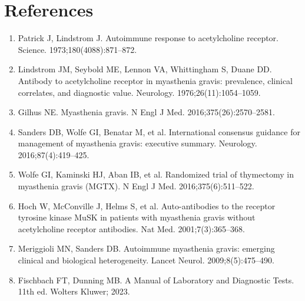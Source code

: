 \section*{References}
\begin{enumerate}
  \item Patrick J, Lindstrom J. Autoimmune response to acetylcholine receptor. Science. 1973;180(4088):871--872.
  \item Lindstrom JM, Seybold ME, Lennon VA, Whittingham S, Duane DD. Antibody to acetylcholine receptor in myasthenia gravis: prevalence, clinical correlates, and diagnostic value. Neurology. 1976;26(11):1054--1059.
  \item Gilhus NE. Myasthenia gravis. N Engl J Med. 2016;375(26):2570--2581.
  \item Sanders DB, Wolfe GI, Benatar M, et al. International consensus guidance for management of myasthenia gravis: executive summary. Neurology. 2016;87(4):419--425.
  \item Wolfe GI, Kaminski HJ, Aban IB, et al. Randomized trial of thymectomy in myasthenia gravis (MGTX). N Engl J Med. 2016;375(6):511--522.
  \item Hoch W, McConville J, Helms S, et al. Auto-antibodies to the receptor tyrosine kinase MuSK in patients with myasthenia gravis without acetylcholine receptor antibodies. Nat Med. 2001;7(3):365--368.
  \item Meriggioli MN, Sanders DB. Autoimmune myasthenia gravis: emerging clinical and biological heterogeneity. Lancet Neurol. 2009;8(5):475--490.
  \item Fischbach FT, Dunning MB. A Manual of Laboratory and Diagnostic Tests. 11th ed. Wolters Kluwer; 2023.
\end{enumerate}

\clearpage
